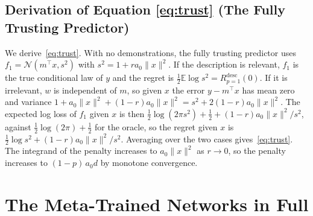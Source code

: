 \documentclass{article}
\newcommand{\E}{\mathbb{E}}
\begin{document}
\subsection{Derivation of Equation \eqref{eq:trust} (The Fully Trusting Predictor)}\label{app:trust}
We derive~\eqref{eq:trust}. With no demonstrations, the fully trusting predictor uses $f_1 = \mathcal{N}(m^\top x, s^2)$ with $s^2 = 1 + r a_0 \|x\|^2$. If the description is relevant, $f_1$ is the true conditional law of $y$ and the regret is $\tfrac12 \E \log s^2 = R^{\mathrm{desc}}_{p=1}(0)$. If it is irrelevant, $w$ is independent of $m$, so given $x$ the error $y - m^\top x$ has mean zero and variance $1 + a_0\|x\|^2 + (1-r)a_0\|x\|^2 = s^2 + 2(1-r)a_0\|x\|^2$. The expected log loss of $f_1$ given $x$ is then $\tfrac12 \log(2\pi s^2) + \tfrac12 + (1-r)a_0\|x\|^2/s^2$, against $\tfrac12 \log(2\pi) + \tfrac12$ for the oracle, so the regret given $x$ is $\tfrac12 \log s^2 + (1-r)a_0\|x\|^2/s^2$. Averaging over the two cases gives~\eqref{eq:trust}. The integrand of the penalty increases to $a_0\|x\|^2$ as $r \to 0$, so the penalty increases to $(1-p)\,a_0 d$ by monotone convergence.

\section{The Meta-Trained Networks in Full}\label{app:networks}
\begin{table}[!htb]
\centering\small
\caption{Networks against the reference predictors ($d=5$, $a_0=10$; $20{,}000$ evaluation prompts per network, with the standard error of its ESS), grouped by training reliability; the last group is the second seed. ``Trained'' and ``calibrated'' are the Bayes-optimal predictors with the training and the test reliability, shown once where they coincide; ``single Gaussian'' is the best predictive that a mean and a variance can express, for a network tested at its own training reliability $p < 1$. Calibrated values, and trained values where the two reliabilities coincide, use $200{,}000$ prompts (standard errors at most $0.12$); other trained values use the network's evaluation prompts, and single-Gaussian values $100{,}000$ prompts. ``Trust'' is the network's implied trust with no demonstrations, on the grid $0.001$, $0.01$, $0.05$, $0.1$, \dots, $0.95$, $0.99$, $0.999$.}
\label{tab:networks}
\vspace{3pt}

\end{table}
\end{document}
